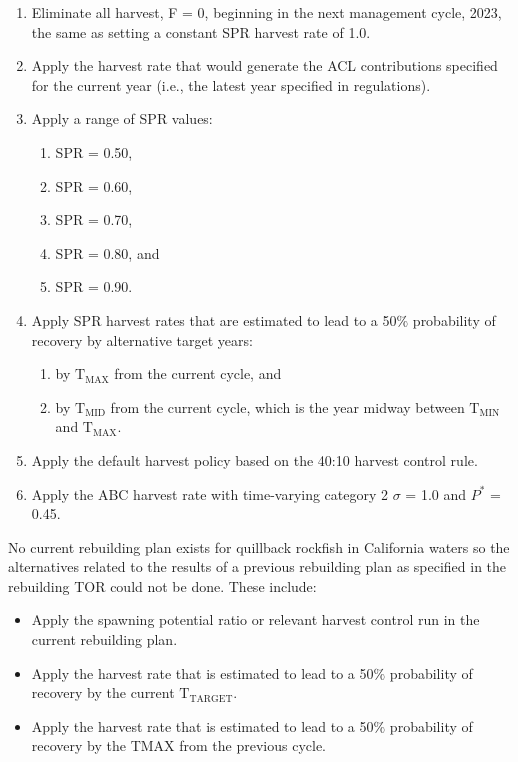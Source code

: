 \documentclass[11pt,
  english,
  a4paper,
]{article}
\begin{document}
\leavevmode\tagmcend\tagstructend\par

\begin{enumerate}
    \item Eliminate all harvest, F = 0, beginning in the next management cycle, 2023, the same as setting a constant SPR harvest rate of 1.0.
    \item Apply the harvest rate that would generate the ACL contributions specified for the current year (i.e., the latest year specified in regulations).
    \item Apply a range of SPR values: 
    \begin{enumerate}
     \item SPR = 0.50,
     \item SPR = 0.60,
     \item SPR = 0.70,
     \item SPR = 0.80, and
     \item SPR = 0.90. 
    \end{enumerate}
    \item Apply SPR harvest rates that are estimated to lead to a 50$\%$ probability of recovery by alternative target years: 
    \begin{enumerate}
     \item by $\text{T}_\text{MAX}$ from the current cycle, and 
     \item by $\text{T}_\text{MID}$ from the current cycle, which is the year midway between $\text{T}_\text{MIN}$ and $\text{T}_\text{MAX}$.
    \end{enumerate}
    \item Apply the default harvest policy based on the 40:10 harvest control rule.
    \item Apply the ABC harvest rate with time-varying category 2 $\sigma$ = 1.0 and $P^*$ = 0.45.
\end{enumerate}


No current rebuilding plan exists for quillback rockfish in California waters so the alternatives related to the results of a previous rebuilding plan as specified in the rebuilding TOR could not be done. These include:

\leavevmode\tagmcend\tagstructend\par

\begin{itemize}
 \item Apply the spawning potential ratio or relevant harvest control run in the current rebuilding plan. 
 \item Apply the harvest rate that is estimated to lead to a 50$\%$ probability of recovery by the current $\text{T}_\text{TARGET}$.
 \item Apply the harvest rate that is estimated to lead to a 50$\%$ probability of recovery by the TMAX from the previous cycle.
\end{itemize}
\end{document}

